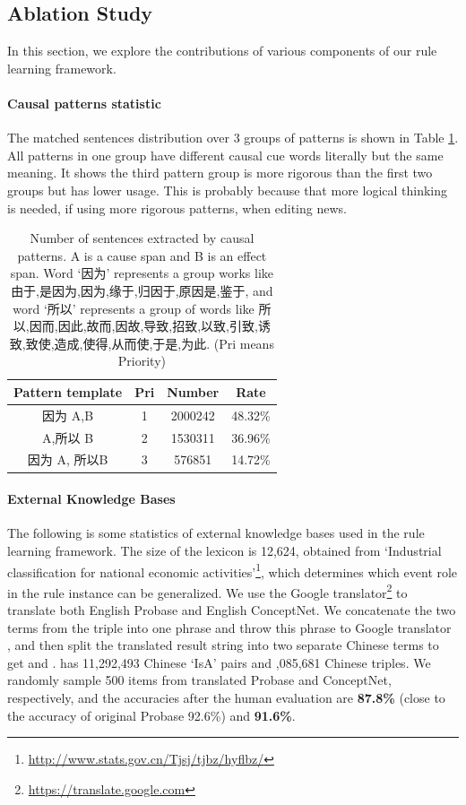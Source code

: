 \subsection{Ablation Study}
In this section, we explore the contributions of various components of our rule learning framework.
\paragraph{Causal patterns statistic} The matched sentences distribution over 3 groups of patterns is shown in Table \ref{tab:pattern_statistics}. All patterns in one group have different causal cue words literally but the same meaning. It shows the third pattern group is more rigorous than the first two groups but has lower usage. This is probably because that more logical thinking is needed, if using more rigorous patterns, when editing news.

\begin{table}[htbp]
	\centering
	\begin{tabular}{|c|c|c|c|} \hline
		\textbf{Pattern template}& \textbf{Pri}&\textbf{Number}& \textbf{Rate}\\	\hline 
		因为 A,B&1&2000242&48.32\% \\ \hline 
		A,所以 B&2&1530311&36.96\% \\ \hline 
		因为 A, 所以B&3&576851&14.72\% \\	\hline
	\end{tabular}
	\caption{Number of sentences extracted by causal patterns. A is a cause span and B is an effect span. Word `因为' represents a group works like 由于,是因为,因为,缘于,归因于,原因是,鉴于, and word `所以' represents a group of words like 所以,因而,因此,故而,因故,导致,招致,以致,引致,诱致,致使,造成,使得,从而使,于是,为此. (Pri means Priority)}
	\label{tab:pattern_statistics}
\end{table}	
\paragraph{External Knowledge Bases}
The following is some statistics of external knowledge bases used in the rule learning framework. The size of the lexicon is 12,624, obtained from `Industrial classification for national economic activities'\footnote{\url{ http://www.stats.gov.cn/Tjsj/tjbz/hyflbz/}}, which determines which event role in the rule instance can be generalized. 
We use the Google translator\footnote{\url{https://translate.google.com}} to translate both English Probase and English ConceptNet. We concatenate the two terms from the triple into one phrase and throw this phrase to Google translator , and then split the translated result string into two separate Chinese terms to get \zhpro and \zhcon.
\zhpro has 11,292,493 Chinese `IsA' pairs and
,085,681 Chinese triples.
We randomly sample 500 items from translated Probase and ConceptNet, respectively, and the accuracies after the human evaluation are \textbf{87.8\%} (close to the accuracy of original Probase 92.6\%) and \textbf{91.6\%}.

